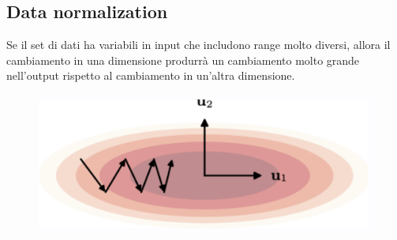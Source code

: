 \subsection{Data normalization} Se il set di dati ha variabili in input che includono range molto diversi, allora il cambiamento in una dimensione produrrà un cambiamento molto grande nell'output rispetto al cambiamento in un'altra dimensione.
\begin{figure}[h]
    \includegraphics[scale=.25]{images/best_practices/momentum.png}
    \centering
\end{figure}



